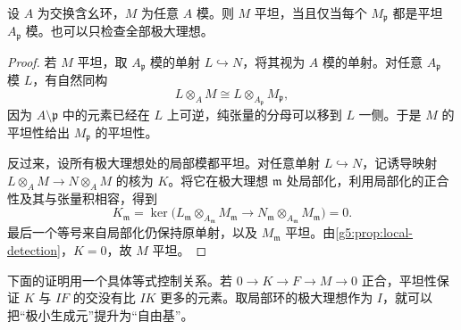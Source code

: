 \begin{proposition}
\label{g5:prop:flat-local-detection}
	设 \(A\) 为交换含幺环，\(M\) 为任意 \(A\) 模。则 \(M\) 平坦，当且仅当每个 \(M_{\mathfrak p}\) 都是平坦 \(A_{\mathfrak p}\) 模。也可以只检查全部极大理想。
\end{proposition}
\begin{proof}
	若 \(M\) 平坦，取 \(A_{\mathfrak p}\) 模的单射 \(L\hookrightarrow N\)，将其视为 \(A\) 模的单射。对任意 \(A_{\mathfrak p}\) 模 \(L\)，有自然同构
	\[
		L\otimes_A M\cong L\otimes_{A_{\mathfrak p}}M_{\mathfrak p},
	\]
	因为 \(A\setminus\mathfrak p\) 中的元素已经在 \(L\) 上可逆，纯张量的分母可以移到 \(L\) 一侧。于是 \(M\) 的平坦性给出 \(M_{\mathfrak p}\) 的平坦性。

	反过来，设所有极大理想处的局部模都平坦。对任意单射 \(L\hookrightarrow N\)，记诱导映射 \(L\otimes_A M\rightarrow N\otimes_A M\) 的核为 \(K\)。将它在极大理想 \(\mathfrak m\) 处局部化，利用局部化的正合性及其与张量积相容，得到
	\[
		K_{\mathfrak m}
		=\ker\bigl(L_{\mathfrak m}\otimes_{A_{\mathfrak m}}M_{\mathfrak m}
		\longrightarrow N_{\mathfrak m}\otimes_{A_{\mathfrak m}}M_{\mathfrak m}\bigr)=0.
	\]
	最后一个等号来自局部化仍保持原单射，以及 \(M_{\mathfrak m}\) 平坦。由\cref{g5:prop:local-detection}，\(K=0\)，故 \(M\) 平坦。
\end{proof}

下面的证明用一个具体等式控制关系。若 \(0\rightarrow K\rightarrow F\rightarrow M\rightarrow0\) 正合，平坦性保证 \(K\) 与 \(IF\) 的交没有比 \(IK\) 更多的元素。取局部环的极大理想作为 \(I\)，就可以把“极小生成元”提升为“自由基”。


